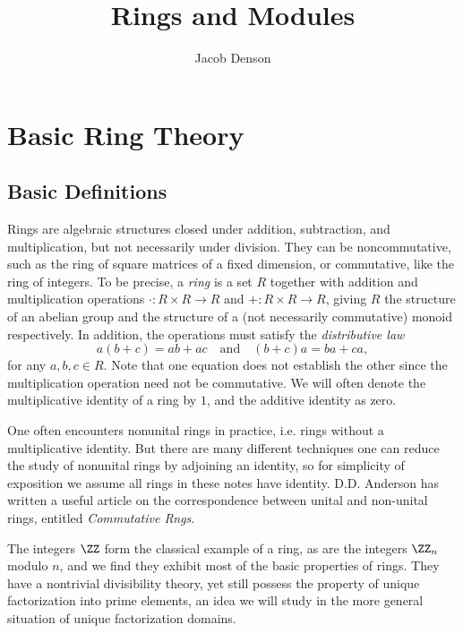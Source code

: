 

\title{Rings and Modules}
\author{Jacob Denson}



\maketitle
\tableofcontents

\part{Basic Ring Theory}

\chapter{Basic Definitions}


Rings are algebraic structures closed under addition, subtraction, and multiplication, but not necessarily under division. They can be noncommutative, such as the ring of square matrices of a fixed dimension, or commutative, like the ring of integers. To be precise, a \emph{ring} is a set $R$ together with addition and multiplication operations $\cdot: R \times R \to R$ and $+: R \times R \to R$, giving $R$ the structure of an abelian group and the structure of a (not necessarily commutative) monoid respectively. In addition, the operations must satisfy the \emph{distributive law}
%
\[ a(b + c) = ab + ac \quad\text{and}\quad (b + c)a = ba + ca, \]
%
for any $a,b,c \in R$. Note that one equation does not establish the other since the multiplication operation need not be commutative. We will often denote the multiplicative identity of a ring by $1$, and the additive identity as zero.

\begin{remark}
    One often encounters nonunital rings in practice, i.e. rings without a multiplicative identity. But there are many different techniques one can reduce the study of nonunital rings by adjoining an identity, so for simplicity of exposition we assume all rings in these notes have identity. D.D. Anderson has written a useful article on the correspondence between unital and non-unital rings, entitled \emph{Commutative Rngs}.
\end{remark}

\begin{example}
    The integers $\ZZ$ form the classical example of a ring, as are the integers $\ZZ_n$ modulo $n$, and we find they exhibit most of the basic properties of rings. They have a nontrivial divisibility theory, yet still possess the property of unique factorization into prime elements, an idea we will study in the more general situation of unique factorization domains.
\end{example}

